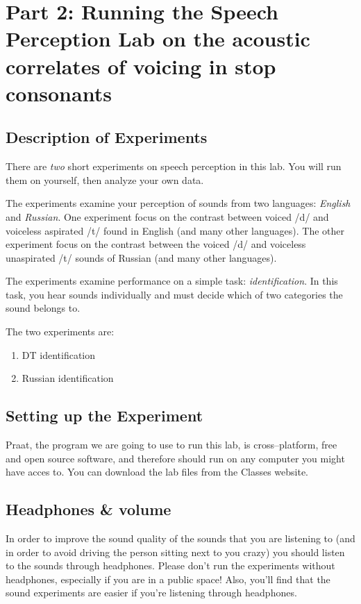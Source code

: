 \documentclass{article}
\newcommand{\soft}[1]{\textsf{#1}}
\newcommand{\Praat}{\soft{Praat}}
\begin{document}
%
%
 	
\section{Part 2: Running the Speech Perception Lab on the acoustic correlates of voicing in stop consonants}

\subsection{Description of Experiments}

There are \emph{two} short experiments on speech perception in this lab. You will run them on yourself, then analyze your own data.

The experiments examine your perception of sounds from two languages: \emph{English} and \emph{Russian}. One experiment focus on the contrast between voiced /d/ and voiceless aspirated /t/ found in English (and many other languages). The other experiment focus on the contrast between the voiced /d/ and voiceless unaspirated /t/ sounds of Russian (and many other languages).

The experiments examine performance on a simple task: \emph{identification}. In this task, you hear sounds individually and must decide which of two categories the sound belongs to.

The two experiments are:

\begin{enumerate}
\item DT identification
\item Russian identification
\end{enumerate}

\subsection{Setting up the Experiment}

\Praat{}, the program we are going to use to run this lab, is cross--platform, free and open source software, and therefore should run on any computer you might have acces to. You can download the lab files from the Classes website.

\subsection{Headphones \& volume}

In order to improve the sound quality of the sounds that you are listening to (and in order to avoid driving the person sitting next to you crazy) you should listen to the sounds through headphones. Please don't run the experiments without headphones, especially if you are in a public space! Also, you'll find that the sound experiments are easier if you're listening through headphones.
\end{document}
